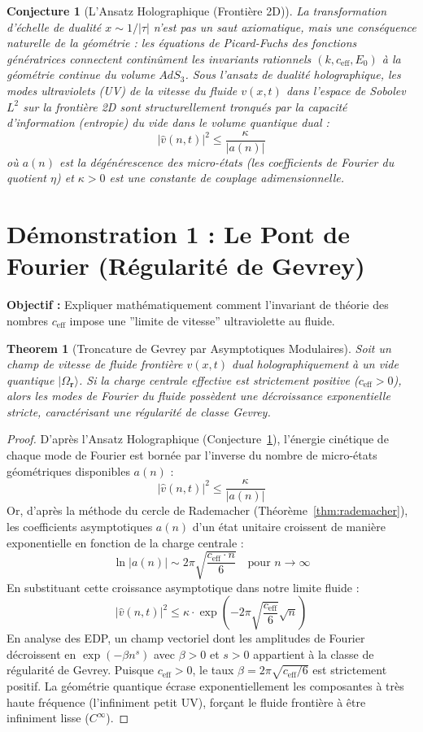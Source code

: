 \documentclass[11pt,twoside,openright]{book}
\newtheorem{theorem}{Theorem}[chapter]
\newtheorem{conjecture}{Conjecture}[chapter]
\begin{document}
\begin{conjecture}[L'Ansatz Holographique (Frontière 2D)]\label{conj:holo}
La transformation d'échelle de dualité $x \sim 1/|\tau|$ n'est pas un saut axiomatique, mais une conséquence naturelle de la géométrie : les équations de Picard-Fuchs des fonctions génératrices connectent continûment les invariants rationnels $(k, c_{\text{eff}}, E_0)$ à la géométrie continue du volume $AdS_3$. Sous l'ansatz de dualité holographique, les modes ultraviolets (UV) de la vitesse du fluide $v(x,t)$ dans l'espace de Sobolev $L^2$ sur la frontière 2D sont structurellement tronqués par la capacité d'information (entropie) du vide dans le volume quantique dual :
\[ |\hat{v}(n, t)|^2 \le \frac{\kappa}{|a(n)|} \]
où $a(n)$ est la dégénérescence des micro-états (les coefficients de Fourier du quotient $\eta$) et $\kappa > 0$ est une constante de couplage adimensionnelle.
\end{conjecture}

\section{Démonstration 1 : Le Pont de Fourier (Régularité de Gevrey)}

\textbf{Objectif :} Expliquer mathématiquement comment l'invariant de théorie des nombres $c_{\text{eff}}$ impose une ''limite de vitesse'' ultraviolette au fluide.

\begin{theorem}[Troncature de Gevrey par Asymptotiques Modulaires]\label{thm:gevrey}
Soit un champ de vitesse de fluide frontière $v(x,t)$ dual holographiquement à un vide quantique $|\Omega_{\mathbf{r}}\rangle$. Si la charge centrale effective est strictement positive ($c_{\text{eff}} > 0$), alors les modes de Fourier du fluide possèdent une décroissance exponentielle stricte, caractérisant une régularité de classe Gevrey.
\end{theorem}

\begin{proof}
D'après l'Ansatz Holographique (Conjecture~\ref{conj:holo}), l'énergie cinétique de chaque mode de Fourier est bornée par l'inverse du nombre de micro-états géométriques disponibles $a(n)$ :
\[ |\hat{v}(n, t)|^2 \le \frac{\kappa}{|a(n)|} \]
Or, d'après la méthode du cercle de Rademacher (Théorème~\ref{thm:rademacher}), les coefficients asymptotiques $a(n)$ d'un état unitaire croissent de manière exponentielle en fonction de la charge centrale :
\[ \ln |a(n)| \sim 2\pi \sqrt{\frac{c_{\text{eff}} \cdot n}{6}} \quad \text{pour } n \to \infty \]
En substituant cette croissance asymptotique dans notre limite fluide :
\[ |\hat{v}(n, t)|^2 \le \kappa \cdot \exp\left(-2\pi \sqrt{\frac{c_{\text{eff}}}{6}} \sqrt{n}\right) \]
En analyse des EDP, un champ vectoriel dont les amplitudes de Fourier décroissent en $\exp(-\beta n^s)$ avec $\beta > 0$ et $s > 0$ appartient à la classe de régularité de Gevrey. Puisque $c_{\text{eff}} > 0$, le taux $\beta = 2\pi\sqrt{c_{\text{eff}}/6}$ est strictement positif. La géométrie quantique écrase exponentiellement les composantes à très haute fréquence (l'infiniment petit UV), forçant le fluide frontière à être infiniment lisse ($C^\infty$).
\end{proof}
\end{document}
